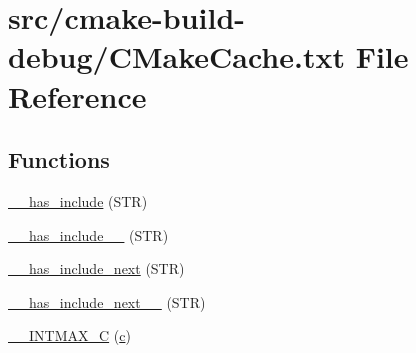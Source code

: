 \hypertarget{CMakeCache_8txt}{}\section{src/cmake-\/build-\/debug/\+C\+Make\+Cache.txt File Reference}
\label{CMakeCache_8txt}
\subsection*{Functions}
\begin{DoxyCompactItemize}
\item 
\hyperlink{CMakeCache_8txt_a15033d43fd4881ecb41d0a9ef3f98c8b}{\+\_\+\+\_\+has\+\_\+include} (S\+TR)
\item 
\hyperlink{CMakeCache_8txt_a97e2b5b7d48e0c704f01b437bbb41bc3}{\+\_\+\+\_\+has\+\_\+include\+\_\+\+\_\+} (S\+TR)
\item 
\hyperlink{CMakeCache_8txt_a6bc72b80bcdbfe30be5d38536affde6f}{\+\_\+\+\_\+has\+\_\+include\+\_\+next} (S\+TR)
\item 
\hyperlink{CMakeCache_8txt_ac96b06945e62d6ea6764b6d86745ec26}{\+\_\+\+\_\+has\+\_\+include\+\_\+next\+\_\+\+\_\+} (S\+TR)
\item 
\hyperlink{CMakeCache_8txt_a2f10a19f2682f0eb61615edae3fa69ef}{\+\_\+\+\_\+\+I\+N\+T\+M\+A\+X\+\_\+C} (\hyperlink{CMakeCache_8txt_aac1d6a1710812201527c735f7c6afbaa}{c})
\end{DoxyCompactItemize}
